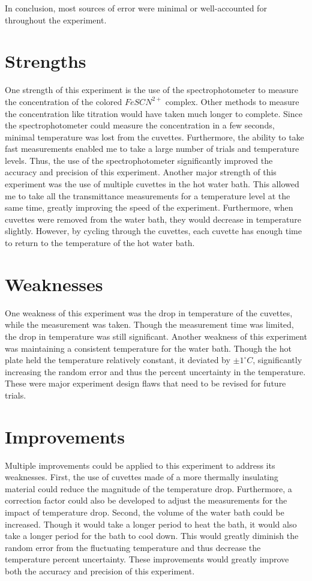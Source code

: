 In conclusion, most sources of error were minimal or well-accounted for throughout the experiment.

\section{Strengths}
One strength of this experiment is the use of the spectrophotometer to measure the concentration of the colored \(FeSCN^{2+}\) complex. Other methods to measure the concentration like titration would have taken much longer to complete. Since the spectrophotometer could measure the concentration in a few seconds, minimal temperature was lost from the cuvettes. Furthermore, the ability to take fast measurements enabled me to take a large number of trials and temperature levels. Thus, the use of the spectrophotometer significantly improved the accuracy and precision of this experiment. Another major strength of this experiment was the use of multiple cuvettes in the hot water bath. This allowed me to take all the transmittance measurements for a temperature level at the same time, greatly improving the speed of the experiment. Furthermore, when cuvettes were removed from the water bath, they would decrease in temperature slightly. However, by cycling through the cuvettes, each cuvette has enough time to return to the temperature of the hot water bath. 

\section{Weaknesses}
One weakness of this experiment was the drop in temperature of the cuvettes, while the measurement was taken. Though the measurement time was limited, the drop in temperature was still significant. Another weakness of this experiment was maintaining a consistent temperature for the water bath. Though the hot plate held the temperature relatively constant, it deviated by \(\pm 1^\circ C\), significantly increasing the random error and thus the percent uncertainty in the temperature. These were major experiment design flaws that need to be revised for future trials.

\section{Improvements}
Multiple improvements could be applied to this experiment to address its weaknesses. First, the use of cuvettes made of a more thermally insulating material could reduce the magnitude of the temperature drop. Furthermore, a correction factor could also be developed to adjust the measurements for the impact of temperature drop. Second, the volume of the water bath could be increased. Though it would take a longer period to heat the bath, it would also take a longer period for the bath to cool down. This would greatly diminish the random error from the fluctuating temperature and thus decrease the temperature percent uncertainty. These improvements would greatly improve both the accuracy and precision of this experiment.

